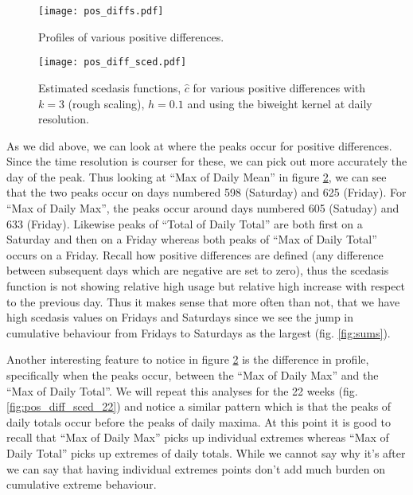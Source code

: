 \documentclass[a4paper]{article}
\begin{document}
\begin{figure}
\centering
\texttt{[image: pos\_diffs.pdf]}
\caption{\label{fig:pos_diff} Profiles of various positive differences.}
\end{figure}

\begin{figure}
\texttt{[image: pos\_diff\_sced.pdf]}
\caption{\label{fig:pos_diff_sced} Estimated scedasis functions, $\hat{c}$ for various positive differences with $k=3$ (rough scaling), $h=0.1$ and using the biweight kernel at daily resolution.}
\end{figure}

As we did above, we can look at where the peaks occur for positive differences. Since the time resolution is courser for these, we can pick out more accurately the day of the peak. Thus looking at ``Max of Daily Mean'' in figure \ref{fig:pos_diff_sced}, we can see that the two peaks occur on days numbered 598 (Saturday) and 625 (Friday). For ``Max of Daily Max'', the peaks occur around days numbered 605 (Satuday) and 633 (Friday). Likewise peaks of ``Total of Daily Total'' are both first on a Saturday and then on a Friday whereas both peaks of ``Max of Daily Total'' occurs on a Friday. Recall how positive differences are defined (any difference between subsequent days which are negative are set to zero), thus the scedasis function is not showing relative high usage but relative high increase with respect to the previous day. Thus it makes sense that more often than not, that we have high scedasis values on Fridays and Saturdays since we see the jump in cumulative behaviour from Fridays to Saturdays as the largest (fig. \ref{fig:sums}).

Another interesting feature to notice in figure \ref{fig:pos_diff_sced} is the difference in profile, specifically when the peaks occur, between the ``Max of Daily Max'' and the ``Max of Daily Total''. We will repeat this analyses for the 22 weeks (fig. \ref{fig:pos_diff_sced_22}) and notice a similar pattern which is that the peaks of daily totals occur before the peaks of daily maxima. At this point it is good to recall that ``Max of Daily Max'' picks up individual extremes whereas ``Max of Daily Total'' picks up extremes of daily totals. While we cannot say why it's after we can say that having individual extremes points don't add much burden on cumulative extreme behaviour.
\end{document}
